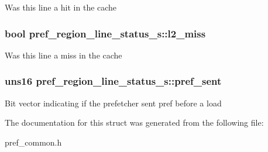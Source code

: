 \label{structpref__region__line__status__s_a3a792d0fa5a569885b3140dc6e7bb4cf}
Was this line a hit in the cache \hypertarget{structpref__region__line__status__s_a966e10800fabfe683412b2ad249d2308}{
\subsubsection[{l2\_\-miss}]{\setlength{\rightskip}{0pt plus 5cm}bool {\bf pref\_\-region\_\-line\_\-status\_\-s::l2\_\-miss}}}
\label{structpref__region__line__status__s_a966e10800fabfe683412b2ad249d2308}
Was this line a miss in the cache \hypertarget{structpref__region__line__status__s_acc76237bba89f651fb6b24ae943be2bd}{
\subsubsection[{pref\_\-sent}]{\setlength{\rightskip}{0pt plus 5cm}uns16 {\bf pref\_\-region\_\-line\_\-status\_\-s::pref\_\-sent}}}
\label{structpref__region__line__status__s_acc76237bba89f651fb6b24ae943be2bd}
Bit vector indicating if the prefetcher sent pref before a load 

The documentation for this struct was generated from the following file:\begin{DoxyCompactItemize}
\item 
pref\_\-common.h\end{DoxyCompactItemize}
